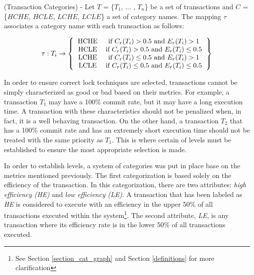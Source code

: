 
\begin{definition}
\label{transaction_categories}
(Transaction Categories) - Let $T$ = \{$T_{1}$, ... , $T_{n}$\} be a set of transactions and $C$ = \{$HCHE$, $HCLE$, $LCHE$, $LCLE$\} a set of category names. The mapping $\tau$ associates a category name with each transaction as follows:

\[ 
\tau : \textrm{$T_{i}$}\rightarrow
\left \{
  \begin{tabular}{cc}
  HCHE & if $C_{r}(T_{i}) > 0.5$ and $E_{r}(T_{i}) > 1$ \\
  HCLE & if $C_{r}(T_{i}) > 0.5$ and $E_{r}(T_{i}) \le 0.5$ \\
  LCHE & if $C_{r}(T_{i}) \le 0.5$ and $E_{r}(T_{i}) > 1$ \\
  LCLE & if $C_{r}(T_{i}) \le 0.5$ and $E_{r}(T_{i}) \le 0.5$
  \end{tabular}
\right \}
\]

{\normalfont In order to ensure correct lock techniques are selected, transactions cannot be simply characterized as good or bad based on their metrics. For example, a transaction $T_{1}$ may have a 100\% commit rate, but it may have a long execution time. A transaction with these characteristics should not be penalized when, in fact, it is a well behaving transaction. On the other hand, a transaction $T_{2}$ that has a 100\% commit rate and has an extremely short execution time should not be treated with the same priority as $T_{1}$. This is where certain of levels must be established to ensure the most appropriate selection is made.

In order to establish levels, a system of categories was put in place base on the metrics mentioned previously. The first categorization is based solely on the efficiency of the transaction. In this categorization, there are two attributes: \textit{high efficiency (HE)} and \textit{low efficiency (LE)}. A transaction that has been labeled as \textit{HE} is considered to execute with an efficiency in the upper 50\% of all transactions executed within the system\footnote{See Section \ref{section_cat_graph} and Section \ref{definitions} for more clarification}. The second attribute, \textit{LE}, is any transaction where its efficiency rate is in the lower 50\% of all transactions executed.

}
\end{definition}

